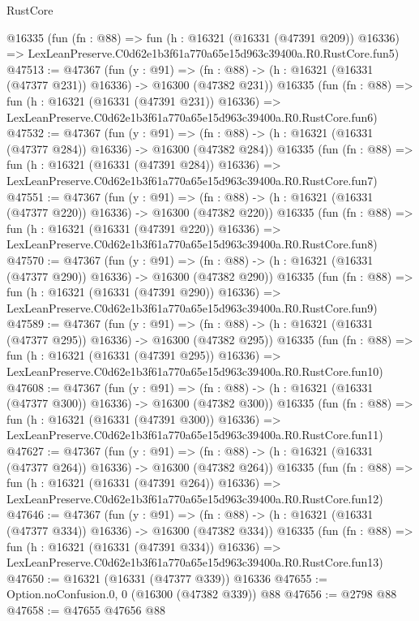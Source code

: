 \begin{lexlean}{RustCore}
\begin{coremodule}
    @16335
    (fun (fn : @88) =>
    fun (h : @16321 (@16331 (@47391 @209)) @16336) =>
    LexLeanPreserve.C0d62e1b3f61a770a65e15d963c39400a.R0.RustCore.fun5)
@47513 := @47367
    (fun (y : @91) =>
    (fn : @88) -> (h : @16321 (@16331 (@47377 @231)) @16336) -> @16300 (@47382 @231))
    @16335
    (fun (fn : @88) =>
    fun (h : @16321 (@16331 (@47391 @231)) @16336) =>
    LexLeanPreserve.C0d62e1b3f61a770a65e15d963c39400a.R0.RustCore.fun6)
@47532 := @47367
    (fun (y : @91) =>
    (fn : @88) -> (h : @16321 (@16331 (@47377 @284)) @16336) -> @16300 (@47382 @284))
    @16335
    (fun (fn : @88) =>
    fun (h : @16321 (@16331 (@47391 @284)) @16336) =>
    LexLeanPreserve.C0d62e1b3f61a770a65e15d963c39400a.R0.RustCore.fun7)
@47551 := @47367
    (fun (y : @91) =>
    (fn : @88) -> (h : @16321 (@16331 (@47377 @220)) @16336) -> @16300 (@47382 @220))
    @16335
    (fun (fn : @88) =>
    fun (h : @16321 (@16331 (@47391 @220)) @16336) =>
    LexLeanPreserve.C0d62e1b3f61a770a65e15d963c39400a.R0.RustCore.fun8)
@47570 := @47367
    (fun (y : @91) =>
    (fn : @88) -> (h : @16321 (@16331 (@47377 @290)) @16336) -> @16300 (@47382 @290))
    @16335
    (fun (fn : @88) =>
    fun (h : @16321 (@16331 (@47391 @290)) @16336) =>
    LexLeanPreserve.C0d62e1b3f61a770a65e15d963c39400a.R0.RustCore.fun9)
@47589 := @47367
    (fun (y : @91) =>
    (fn : @88) -> (h : @16321 (@16331 (@47377 @295)) @16336) -> @16300 (@47382 @295))
    @16335
    (fun (fn : @88) =>
    fun (h : @16321 (@16331 (@47391 @295)) @16336) =>
    LexLeanPreserve.C0d62e1b3f61a770a65e15d963c39400a.R0.RustCore.fun10)
@47608 := @47367
    (fun (y : @91) =>
    (fn : @88) -> (h : @16321 (@16331 (@47377 @300)) @16336) -> @16300 (@47382 @300))
    @16335
    (fun (fn : @88) =>
    fun (h : @16321 (@16331 (@47391 @300)) @16336) =>
    LexLeanPreserve.C0d62e1b3f61a770a65e15d963c39400a.R0.RustCore.fun11)
@47627 := @47367
    (fun (y : @91) =>
    (fn : @88) -> (h : @16321 (@16331 (@47377 @264)) @16336) -> @16300 (@47382 @264))
    @16335
    (fun (fn : @88) =>
    fun (h : @16321 (@16331 (@47391 @264)) @16336) =>
    LexLeanPreserve.C0d62e1b3f61a770a65e15d963c39400a.R0.RustCore.fun12)
@47646 := @47367
    (fun (y : @91) =>
    (fn : @88) -> (h : @16321 (@16331 (@47377 @334)) @16336) -> @16300 (@47382 @334))
    @16335
    (fun (fn : @88) =>
    fun (h : @16321 (@16331 (@47391 @334)) @16336) =>
    LexLeanPreserve.C0d62e1b3f61a770a65e15d963c39400a.R0.RustCore.fun13)
@47650 := @16321 (@16331 (@47377 @339)) @16336
@47655 := Option.noConfusion.{0, 0} (@16300 (@47382 @339)) @88
@47656 := @2798 @88
@47658 := @47655 @47656 @88

\end{coremodule}
\end{lexlean}
